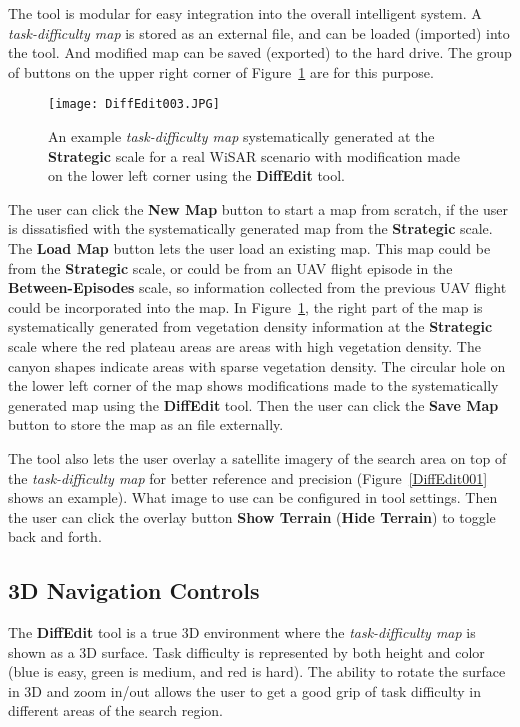 The tool is modular for easy integration into the overall intelligent system. A \textit{task-difficulty map} is stored as an external file, and can be loaded (imported) into the tool. And modified map can be saved (exported) to the hard drive. The group of buttons on the upper right corner of Figure~\ref{DiffEdit003} are for this purpose.

\begin{figure}
\centering
\texttt{[image: DiffEdit003.JPG]}
\caption{An example \textit{task-difficulty map} systematically generated at the \textbf{Strategic} scale for a real WiSAR scenario with modification made on the lower left corner using the \textbf{DiffEdit} tool.}
\label{DiffEdit003}
\end{figure}

The user can click the \textbf{New Map} button to start a map from scratch, if the user is dissatisfied with the systematically generated map from the \textbf{Strategic} scale. The \textbf{Load Map} button lets the user load an existing map. This map could be from the \textbf{Strategic} scale, or could be from an UAV flight episode in the \textbf{Between-Episodes} scale, so information collected from the previous UAV flight could be incorporated into the map. In Figure~\ref{DiffEdit003}, the right part of the map is systematically generated from vegetation density information at the \textbf{Strategic} scale where the red plateau areas are areas with high vegetation density. The canyon shapes indicate areas with sparse vegetation density. The circular hole on the lower left corner of the map shows modifications made to the systematically generated map using the \textbf{DiffEdit} tool. Then the user can click the \textbf{Save Map} button to store the map as an file externally.

The tool also lets the user overlay a satellite imagery of the search area on top of the \textit{task-difficulty map} for better reference and precision (Figure~\ref{DiffEdit001} shows an example). What image to use can be configured in tool settings. Then the user can click the overlay button \textbf{Show Terrain} (\textbf{Hide Terrain}) to toggle back and forth.

\subsection{3D Navigation Controls}

The \textbf{DiffEdit} tool is a true 3D environment where the \textit{task-difficulty map} is shown as a 3D surface. Task difficulty is represented by both height and color (blue is easy, green is medium, and red is hard). The ability to rotate the surface in 3D and zoom in/out allows the user to get a good grip of task difficulty in different areas of the search region.

